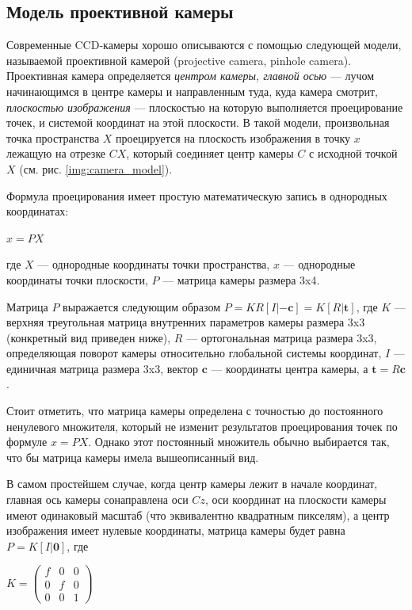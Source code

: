 \subsection{Модель проективной камеры}
Современные CCD-камеры хорошо описываются с помощью следующей модели, называемой проективной камерой (projective camera, pinhole camera). Проективная камера определяется \textit{центром камеры, главной осью} — лучом начинающимся в центре камеры и направленным туда, куда камера смотрит, \textit{плоскостью изображения} — плоскостью на которую выполняется проецирование точек, и системой координат на этой плоскости. В такой модели, произвольная точка пространства $X$ проецируется на плоскость изображения в точку $x$ лежащую на отрезке $CX$, который соединяет центр камеры $C$ с исходной точкой $X$ (см. рис. \ref{img:camera_model}).


Формула проецирования имеет простую математическую запись в однородных координатах: 

$x = P X$

где $X$ — однородные координаты точки пространства, $x$ — однородные координаты точки плоскости, $P$ — матрица камеры размера 3x4.

Матрица $P$ выражается следующим образом $P = KR[ I | -\textbf{c}] = K[R|\textbf{t}]$, где $K$ — верхняя треугольная матрица внутренних параметров камеры размера 3x3 (конкретный вид приведен ниже), $R$ — ортогональная матрица размера 3x3, определяющая поворот камеры относительно глобальной системы координат, $I$ — единичная матрица размера 3x3, вектор $\textbf{c}$ — координаты центра камеры, а $\textbf{t} = R\textbf{c}$.

Стоит отметить, что матрица камеры определена с точностью до постоянного ненулевого множителя, который не изменит результатов проецирования точек по формуле $x = P X$. Однако этот постоянный множитель обычно выбирается так, что бы матрица камеры имела вышеописанный вид.

В самом простейшем случае, когда центр камеры лежит в начале координат, главная ось камеры сонаправлена оси $Cz$, оси координат на плоскости камеры имеют одинаковый масштаб (что эквивалентно квадратным пикселям), а центр изображения имеет нулевые координаты, матрица камеры будет равна $P = K[I|\textbf{0}]$, где

$K = \begin{pmatrix}
	f & 0 & 0\\
	0 & f & 0\\
	0 & 0 & 1
\end{pmatrix}$

